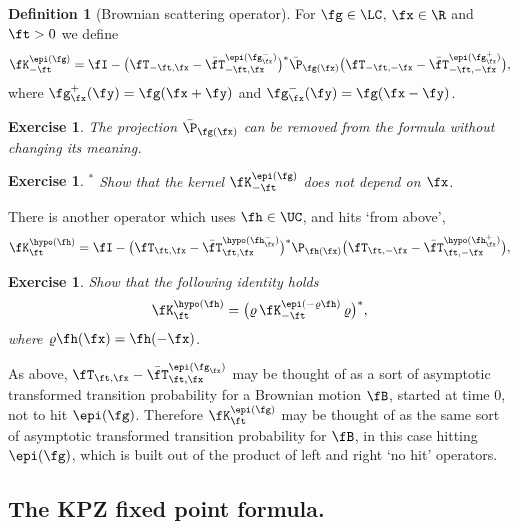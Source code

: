 \documentclass[]{pcmi}
\theoremstyle{plain}
\newtheorem{exercise}[equation]{Exercise}
\theoremstyle{definition}
\newtheorem{definition}[equation]{Definition}
\begin{document}
\begin{definition}[Brownian scattering operator]\label{def:epi}
For $\fg\in \LC$, $\fx\in \R$ and $\ft>0$ we define
\begin{equation}
\fK^{\epi(\fg)}_{-\ft}= \fI - \bigl(\fT_{-\ft,\fx} - \bar{\fT}^{\epi(\fg^-_\fx)}_{-\ft,\fx} \bigr)^* \bar\P_{\fg(\fx)}
\bigl(\fT_{-\ft,-\fx}-\bar{\fT}^{\epi(\fg^+_\fx)}_{-\ft,-\fx}\bigr),
\end{equation}
where $\fg^+_\fx(\fy)=\fg(\fx+\fy)$ and $\fg^-_\fx(\fy)=\fg(\fx-\fy)$.

\begin{exercise} 
The projection $\bar\P_{\fg(\fx)}$ can be removed from the formula without changing its meaning.
\end{exercise}

\begin{exercise}$\!\!\!\!{}^*$
Show that the kernel $\fK^{\epi(\fg)}_{-\ft}$ does not depend on $\fx$.
\end{exercise}

\noindent There is another operator which uses $\fh\in \UC$, and hits `from above',
\begin{equation}\label{eq:Kepihypo}
\fK^{\hypo(\fh)}_{\ft}= \fI - \bigl(\fT_{\ft,\fx} - \bar{\fT}^{\hypo(\fh^-_\fx)}_{\ft,\fx} \bigr)^*\P_{\fh(\fx)} \bigl(\fT_{\ft,-\fx}-\bar{\fT}^{\hypo(\fh^+_\fx)}_{\ft,-\fx}\bigr),
\end{equation}
\end{definition}

\begin{exercise} Show that the following identity holds
\begin{equation}\label{skew}
\fK^{\hypo(\fh)}_{\ft}=\big(\varrho\,\fK^{\epi(-\varrho\fh)}_{-\ft}\,\varrho\big)^*,
\end{equation}
where $\varrho\fh(\fx) = \fh(-\fx)$.
\end{exercise}

As above, $\fT_{\ft,\fx} - \bar{\fT}^{\epi(\fg_\fx)}_{\ft,\fx}$ may be thought of as a sort of asymptotic transformed transition probability for a Brownian motion $\fB$, started at time 0, not to hit $\epi(\fg)$. Therefore $\fK^{\epi(\fg)}_{\ft}$ may be thought of as the same sort of asymptotic transformed transition probability for $\fB$, in this case hitting $\epi(\fg)$, which is built out of the product of left and right `no hit' operators.

\subsection{The KPZ fixed point formula.} 
\label{sec:KPZfp}
\end{document}

